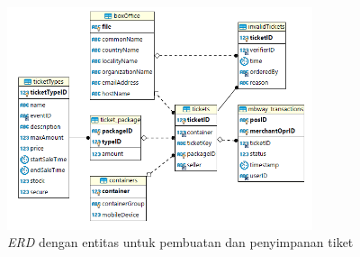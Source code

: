 \begin{figure}[ht]
    \centering
    \includegraphics[width=0.8\textwidth]{resources/chapter-2/er-ticket-storage.png}
    \caption{\textit{ERD} dengan entitas untuk pembuatan dan penyimpanan tiket \parencite{backendForTicketing}}
    \label{fig:ticket-storage}
\end{figure}